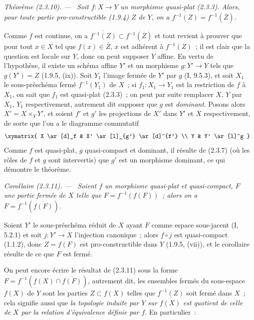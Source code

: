 \documentclass[10pt,oneside]{book}
\newcommand{\oldpage}[2][]{%
  \setcounter{footnote}{0}%
  \marginpar{\scriptsize\textbf{#1}~|~#2}\ignorespaces}
\newenvironment{theorem}[1][]{%
  \par\medskip\noindent\itshape Théorème (#1). ---\ }{\par}
\newenvironment{corollary}[1][]{%
  \par\medskip\noindent\itshape Corollaire (#1). ---\ }{\par}
\begin{document}
\begin{theorem}[2.3.10]
\label{IV.2.3.10-fr}
Soit $f:X\to Y$ un morphisme quasi-plat (2.3.3). Alors, pour toute partie
pro-constructible (1.9.4) $Z$ de $Y$, on a
$\overline{f^{-1}(Z)}=f^{-1}(\overline Z)$.
\end{theorem}

Comme $f$ est continue, on a
$\overline{f^{-1}(Z)}\subset f^{-1}(\overline Z)$ et tout revient à prouver
que pour tout $x\in X$ tel que $f(x)\in\overline Z$, $x$ est adhérent à
$f^{-1}(Z)$~; il est clair que la question est locale sur $Y$, donc on peut
supposer $Y$ affine. En vertu de l'hypothèse, il existe un schéma affine $Y'$
et un morphisme $g:Y'\to Y$ tels que $g(Y')=Z$ (1.9.5, (ix)). Soit $Y_1$
l'image fermée de $Y'$ par $g$ (I, 9.5.3), et soit $X_1$ le sous-préschéma
fermé $f^{-1}(Y_1)$ de $X$~; si $f_1:X_1\to Y_1$ est la restriction de $f$ à
$X_1$, on sait que $f_1$ est quasi-plat (2.3.3)~; on peut par suite remplacer
$X$, $Y$ par $X_1$, $Y_1$ respectivement, autrement dit supposer que $g$ est
\emph{dominant}. Posons alors $X'=X\times_Y Y'$, et soient $f'$ et $g'$ les
projections de $X'$ dans $Y'$ et $X$ respectivement, de sorte que l'on a le
diagramme commutatif
\[
\xymatrix{
  X \ar[d]_f & X' \ar[l]_{g'} \ar[d]^{f'} \\
  Y & Y' \ar[l]^g
}
\]
Comme $f$ est quasi-plat, $g$ quasi-compact et dominant, il résulte de (2.3.7)
(où les rôles de $f$ et $g$ sont intervertis) que $g'$ est un morphisme
dominant, ce qui démontre le théorème.

\begin{corollary}[2.3.11]
\label{IV.2.3.11-fr}
Soient $f$ un morphisme quasi-plat et quasi-compact, $F$ une partie fermée de
$X$ telle que $F=f^{-1}(f(F))$~; alors on a
$F=f^{-1}(\overline{f(F)})$.
\end{corollary}

Soient $Y'$ le sous-préschéma réduit de $X$ ayant $F$ comme espace sous-jacent
(I, 5.2.1) et soit $j:Y'\to X$ l'injection canonique~; alors $f\circ j$ est
quasi-compact (1.1.2),
\oldpage[IV-2]{18}
donc $Z=f(F)$ est pro-constructible dans $Y$ (1.9.5, (vii)), et le corollaire
résulte de ce que $F$ est fermé.

On peut encore écrire le résultat de (2.3.11) sous la forme
$F=f^{-1}(f(X)\cap\overline{f(F)})$, autrement dit, les ensembles fermés du
sous-espace $f(X)$ de $Y$ sont les parties $Z\subset f(X)$ telles que
$f^{-1}(Z)$ soit fermé dans $X$~; cela signifie aussi que \emph{la topologie
induite par $Y$ sur $f(X)$ est quotient de celle de $X$ par la relation
d'équivalence définie par $f$}. En particulier~:
\end{document}

